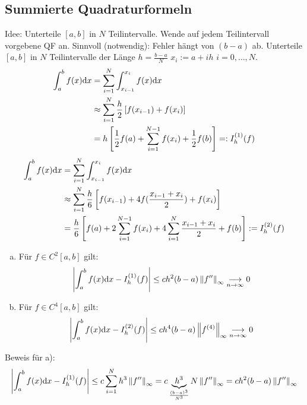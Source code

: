 \subsection{Summierte Quadraturformeln}
Idee: Unterteile $[a,b]$ in $N$ Teilintervalle. Wende auf jedem Teilintervall vorgebene QF an.
Sinnvoll (notwendig): Fehler hängt von $(b-a)$ ab.
Unterteile $[a,b]$ in $N$ Teilintervalle der Länge $h=\frac{b-a}{N}$ $x_i := a + ih$ $i=0,\ldots,N$.
\begin{align*}
  \int_a^b f(x) \mathrm{d}x &= \sum^{N}_{i=1} \int_{x_{i-1}}^{x_i} f(x) \mathrm{d}x\\
  &\approx \sum^{N}_{i=1} \frac{h}{2} \left[f(x_{i-1}) + f(x_i)\right] \\
  &= h\left[\frac{1}{2} f(a) + \sum^{N-1}_{i=1} f(x_i) + \frac{1}{2} f(b)\right] =: I_h^{(1)}(f)
\end{align*}
\begin{align*}
  \int_a^b f(x) \mathrm{d}x &= \sum^{N}_{i=1} \int_{x_{i-1}}^{x_i} f(x) \mathrm{d}x\\
  &\approx \sum^{N}_{i=1} \frac{h}{6} \left[f(x_{i-1}) + 4f(\frac{x_{i-1}+x_i}{2}) + f(x_i)\right] \\
  &= \frac{h}{6} \left[ f(a) + 2 \sum^{N-1}_{i=1} f(x_i) + 4 \sum^{N}_{i=1} \frac{x_{i-1}+x_i}{2} + f(b) \right] := I_h^{(2)}(f)
\end{align*}
\begin{enumerate}[a)]
  \item Für $f \in C^2[a, b]$ gilt: \begin{align*}
    \left| \int_a^b f(x) \mathrm{d}x - I_h^{(1)}(f) \right| \leq ch^2 (b-a) \left\lVert f'' \right\rVert_\infty \underset{n \to \infty}{\longrightarrow} 0
  \end{align*}
  \item Für $f \in C^4[a, b]$ gilt: \begin{align*}
      \left| \int_a^b f(x) \mathrm{d}x - I_h^{(2)}(f) \right| \leq ch^4 (b-a) \left\lVert f^{(4)} \right\rVert_\infty \underset{n \to \infty}{\longrightarrow} 0
  \end{align*}
\end{enumerate}
Beweis für a):
\begin{align*}
  \left| \int_a^b f(x) \mathrm{d}x - I_h^{(1)}(f) \right| \leq c \sum^{N}_{i=1} h^3 \left\lVert f'' \right\rVert_\infty = c \underbrace{h^3}_{\frac{(b-a)^3}{N^3}} N \left\lVert f'' \right\rVert_\infty = c h^2 (b-a) \left\lVert f'' \right\rVert_\infty
\end{align*}
